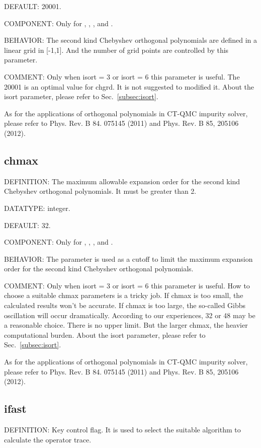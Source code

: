 {\color{blue}DEFAULT:} 20001.

{\color{brown}COMPONENT:} Only for {\gardenia}, {\narcissus}, {\lavender}, and {\manjushaka}.

{\color{purple}BEHAVIOR:} The second kind Chebyshev orthogonal polynomials are defined in a linear grid in [-1,1]. And the number of grid points are controlled by this parameter.

{\color{olive}COMMENT:} Only when isort = 3 or isort = 6 this parameter is useful. The 20001 is an optimal value for chgrd. It is not suggested to modified it. About the isort parameter, please refer to Sec.~\ref{subsec:isort}.

As for the applications of orthogonal polynomials in CT-QMC impurity solver, please refer to Phys. Rev. B 84. 075145 (2011) and Phys. Rev. B 85, 205106 (2012). 

\subsection{chmax}
{\color{red}DEFINITION:} The maximum allowable expansion order for the second kind Chebyshev orthogonal polynomials. It must be greater than 2.

{\color{green}DATATYPE:} integer.

{\color{blue}DEFAULT:} 32.

{\color{brown}COMPONENT:} Only for {\gardenia}, {\narcissus}, {\lavender}, and {\manjushaka}.

{\color{purple}BEHAVIOR:} The parameter is used as a cutoff to limit the maximum expansion order for the second kind Chebyshev orthogonal polynomials.

{\color{olive}COMMENT:} Only when isort = 3 or isort = 6 this parameter is useful. How to choose a suitable chmax parameters is a tricky job. If chmax is too small, the calculated results won't be accurate. If chmax is too large, the so-called Gibbs oscillation will occur dramatically. According to our experiences, 32 or 48 may be a reasonable choice. There is no upper limit. But the larger chmax, the heavier computational burden. About the isort parameter, please refer to Sec.~\ref{subsec:isort}.

As for the applications of orthogonal polynomials in CT-QMC impurity solver, please refer to Phys. Rev. B 84. 075145 (2011) and Phys. Rev. B 85, 205106 (2012).

\subsection{ifast}
{\color{red}DEFINITION:} Key control flag. It is used to select the suitable algorithm to calculate the operator trace. 

